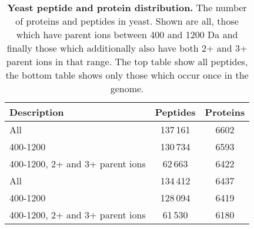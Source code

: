 \begin{table}[h]

\centering
\caption[Yeast peptide and protein distribution.]
{\textbf{Yeast peptide and protein distribution.}
The number of proteins and peptides in yeast. Shown are all, those which have
parent ions between 400 and 1200 Da and finally those which additionally also
have both 2+ and 3+ parent ions in that range. \newline
The top table show all peptides, the bottom table shows only those which occur
once in the genome.
}
\label{tab:yeast_pepprot}

\begin{tabular}{ l c c }
\maketablespace
Description & Peptides  & Proteins \\
\toprule
All & 137\,161 & 6602 \\
400-1200 & 130\,734 & 6593 \\
400-1200, 2+ and 3+ parent ions & \phantom{1}62\,663 & 6422\\
\toprule
All & 134\,412 & 6437 \\
400-1200 & 128\,094 & 6419 \\
400-1200, 2+ and 3+ parent ions & \phantom{1}61\,530 & 6180\\

\end{tabular}

\begin{comment}
drop table tmptbl;
create temporary table tmptbl as
select count(*) as occ , srmPeptides_yeast.peptide_key from hroest.srmPeptides_yeast 
inner join ddb.peptide on srmPeptides_yeast.peptide_key = peptide.id 
inner join ddb.peptideOrganism on peptideOrganism.peptide_key = peptide.id
where q1 > 400 and q1 < 1200 
and genome_occurence = 1
group by srmPeptides_yeast.peptide_key
;
alter table tmptbl add index(peptide_key);

select count(*) from tmptbl
#inner join ddb.protPepLink on protPepLink.peptide_key = tmptbl.peptide_key
#group by protein_key
;

select count(*) from tmptbl
#inner join ddb.protPepLink on protPepLink.peptide_key = tmptbl.peptide_key
where occ = 2
#group by protein_key
;



#
##
#
# -- check whether we really filtered out non-unique peptides
create temporary table unique_yeast_proteins as
select protein_key from ddb.peptide 
#select count(*) from ddb.peptide 
inner join ddb.protPepLink on protPepLink.peptide_key = peptide.id
inner join ddb.peptideOrganism on peptideOrganism.peptide_key = peptide.id
where experiment_key = 3120 
and genome_occurence = 1
group by protein_key
;


\end{comment}
\end{table}
